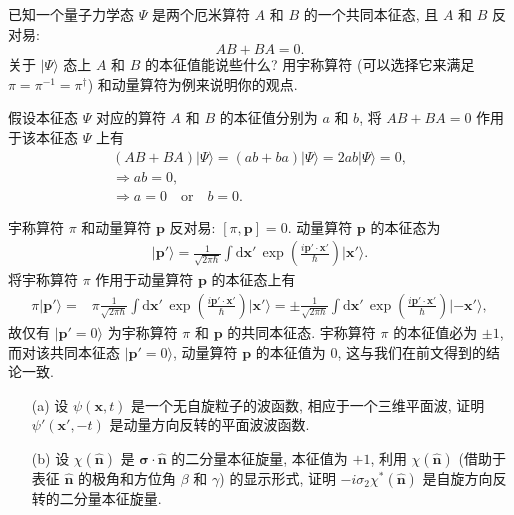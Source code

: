 \documentclass{assignment}
\begin{document}
\begin{prob}[课本习题 4.3]
    已知一个量子力学态 $\Psi$ 是两个厄米算符 $A$ 和 $B$ 的一个共同本征态, 且 $A$ 和 $B$ 反对易:
    \[
        AB+BA=0.
    \]
    关于 $\lvert\Psi\rangle$ 态上 $A$ 和 $B$ 的本征值能说些什么? 用宇称算符 (可以选择它来满足 $\pi=\pi^{-1}=\pi^{\dagger}$) 和动量算符为例来说明你的观点.
\end{prob}
\begin{sol}
    假设本征态 $\Psi$ 对应的算符 $A$ 和 $B$ 的本征值分别为 $a$ 和 $b$, 将 $AB+BA=0$ 作用于该本征态 $\Psi$ 上有
    \begin{gather}
        (AB+BA)\lvert\Psi\rangle=(ab+ba)\lvert\Psi\rangle=2ab\lvert\Psi\rangle=0,\\
        \Longrightarrow ab=0,\\
        \Longrightarrow a=0\quad\text{or}\quad b=0.
    \end{gather}

    宇称算符 $\pi$ 和动量算符 $\bm{p}$ 反对易: $[\pi,\bm{p}]=0$. 动量算符 $\bm{p}$ 的本征态为
    \begin{align}
        \lvert\bm{p}'\rangle=\frac{1}{\sqrt{2\pi\hbar}}\int\mathrm{d}\bm{x}'\,\exp\left(\frac{i\bm{p}'\cdot\bm{x}'}{\hbar}\right)\lvert\bm{x}'\rangle.
    \end{align}
    将宇称算符 $\pi$ 作用于动量算符 $\bm{p}$ 的本征态上有
    \begin{align}
        \pi\lvert\bm{p}'\rangle=&\pi\frac{1}{\sqrt{2\pi\hbar}}\int\mathrm{d}\bm{x}'\,\exp\left(\frac{i\bm{p}'\cdot\bm{x}'}{\hbar}\right)\lvert\bm{x}'\rangle=\pm\frac{1}{\sqrt{2\pi\hbar}}\int\mathrm{d}\bm{x}'\,\exp\left(\frac{i\bm{p}'\cdot\bm{x}'}{\hbar}\right)\lvert-\bm{x}'\rangle,
    \end{align}
    故仅有 $\lvert\bm{p}'=0\rangle$ 为宇称算符 $\pi$ 和 $\bm{p}$ 的共同本征态.
    宇称算符 $\pi$ 的本征值必为 $\pm 1$, 而对该共同本征态 $\lvert\bm{p}'=0\rangle$, 动量算符 $\bm{p}$ 的本征值为 $0$, 这与我们在前文得到的结论一致.
\end{sol}

\begin{prob}[课本习题 4.7]
    \begin{itemize}
        \item[(a)] 设 $\psi(\bm{x},t)$ 是一个无自旋粒子的波函数, 相应于一个三维平面波, 证明 $\psi'(\bm{x}',-t)$ 是动量方向反转的平面波波函数.
        \item[(b)] 设 $\chi(\hat{\bm{n}})$ 是 $\bm{\sigma}\cdot\hat{\bm{n}}$ 的二分量本征旋量, 本征值为 $+1$, 利用 $\chi(\hat{\bm{n}})$ (借助于表征 $\hat{\bm{n}}$ 的极角和方位角 $\beta$ 和 $\gamma$) 的显示形式, 证明 $-i\sigma_2\chi^*(\hat{\bm{n}})$ 是自旋方向反转的二分量本征旋量.
    \end{itemize}
\end{prob}
\begin{pf}
    
\end{pf}
\end{document}
